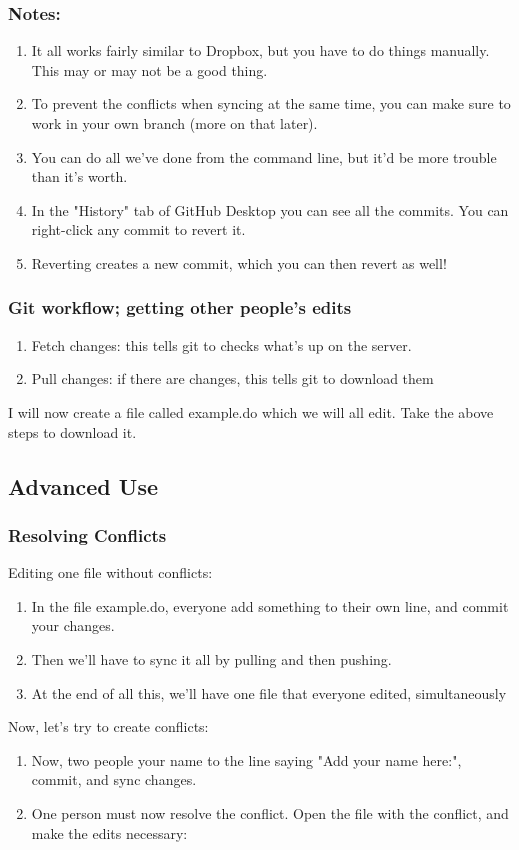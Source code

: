 \documentclass{beamer}
\begin{document}
\begin{frame}
	\frametitle{Notes:}
	\begin{enumerate}
		\item It all works fairly similar to Dropbox, but you have to do things manually. This may or may not be a good thing.
		\item To prevent the conflicts when syncing at the same time, you can make sure to work in your own branch (more on that later).
		\item You can do all we've done from the command line, but it'd be more trouble than it's worth.
		\item In the "History" tab of GitHub Desktop you can see all the commits. You can right-click any commit to revert it. 
		\item Reverting creates a new commit, which you can then revert as well!
	\end{enumerate}
\end{frame}


\begin{frame}
	\frametitle{Git workflow; getting other people's edits}
	\begin{enumerate}
		\item Fetch changes: this tells git to checks what's up on the server.
		\item Pull changes: if there are changes, this tells git to download them
	\end{enumerate}
	I will now create a file called example.do which we will all edit. Take the above steps to download it.
\end{frame}

\subsection{Advanced Use}
\begin{frame}
	\frametitle{Resolving Conflicts}
	Editing one file without conflicts:
	\begin{enumerate}
		\item<2-> In the file example.do, everyone add something to their own line, and commit your changes.
		\item<2-> Then we'll have to sync it all by pulling and then pushing.
		\item<2-> At the end of all this, we'll have one file that everyone edited, simultaneously
	\end{enumerate}
	Now, let's try to create conflicts:
	\begin{enumerate}
		\item<3-> Now, two people your name to the line saying "Add your name here:", commit, and sync changes.
		\item<3-> One person must now resolve the conflict. Open the file with the conflict, and make the edits necessary:
	\end{enumerate}
	
\end{frame}
\end{document}
